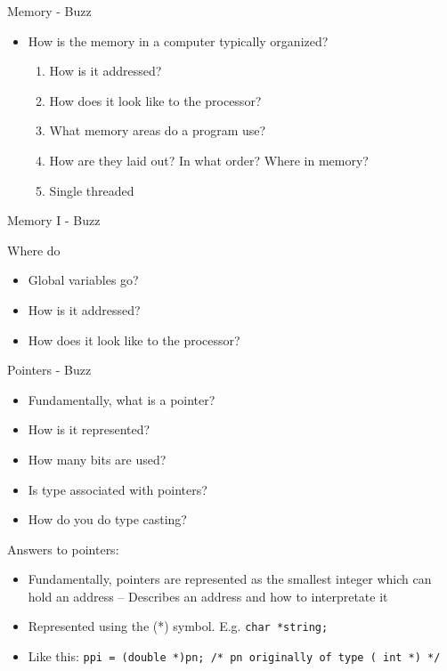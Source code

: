 Memory - Buzz

\begin{itemize}
\item How is the memory in a computer typically organized?
  \begin{enumerate}
    \item How is it addressed?
    \item How does it look like to the processor?
    \item What memory areas do a program use?
    \item How are they laid out? In what order? Where in memory?
    \item Single threaded

  \end{enumerate}
\end{itemize}

Memory I - Buzz

Where do
\begin{itemize}
\item Global variables go?
\item How is it addressed?
\item How does it look like to the processor?
\end{itemize}

Pointers - Buzz

\begin{itemize}
\item Fundamentally, what is a pointer?
\item How is it represented?
\item How many bits are used?
\item Is type associated with pointers?
\item How do you do type casting?
\end{itemize}

Answers to pointers:

\begin{itemize}
\item  Fundamentally, pointers are represented as the smallest integer which can hold an address
– Describes an address and how to interpretate it
\item Represented using the (*) symbol. E.g. {\tt char *string; }
\item Like this: {\tt <++>ppi = (double *)pn; /* pn originally of type ( int *) */ }
\end{itemize}
